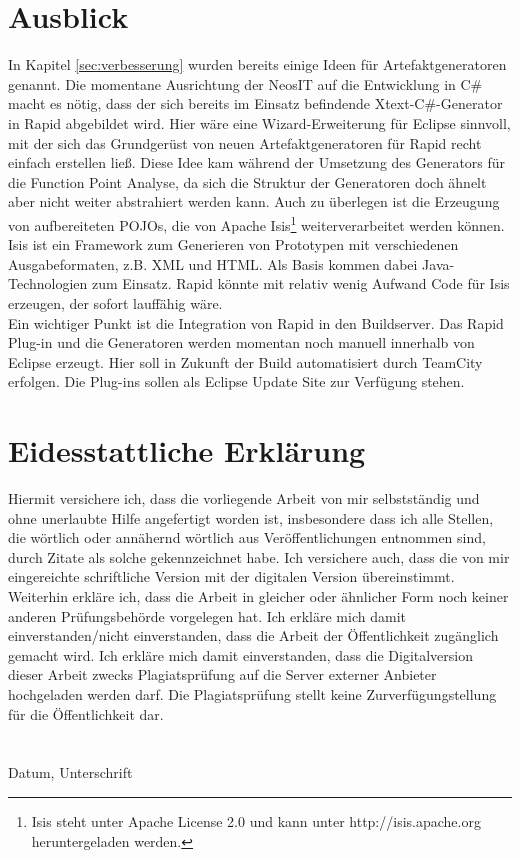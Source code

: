 \documentclass[a4paper,12pt]{scrreprt}
\begin{document}
\chapter{Ausblick}
In Kapitel \ref{sec:verbesserung} wurden bereits einige Ideen für Artefaktgeneratoren genannt. Die momentane Ausrichtung der NeosIT auf die Entwicklung in C\# macht es nötig, dass der sich bereits im Einsatz befindende Xtext-C\#-Generator in Rapid abgebildet wird. Hier wäre eine Wizard-Erweiterung für Eclipse sinnvoll, mit der sich das Grundgerüst von neuen Artefaktgeneratoren für Rapid recht einfach erstellen ließ. Diese Idee kam während der Umsetzung des Generators für die Function Point Analyse, da sich die Struktur der Generatoren doch ähnelt aber nicht weiter abstrahiert werden kann.
Auch zu überlegen ist die Erzeugung von aufbereiteten POJOs, die von Apache Isis\footnote{Isis steht unter Apache License 2.0 und kann unter http://isis.apache.org heruntergeladen werden.} weiterverarbeitet werden können. Isis ist ein Framework zum Generieren von Prototypen mit verschiedenen Ausgabeformaten, z.B. XML und HTML. Als Basis kommen dabei Java-Technologien zum Einsatz. Rapid könnte mit relativ wenig Aufwand Code für Isis erzeugen, der sofort lauffähig wäre.
\\
Ein wichtiger Punkt ist die Integration von Rapid in den Buildserver. Das Rapid Plug-in und die Generatoren werden momentan noch manuell innerhalb von Eclipse erzeugt. Hier soll in Zukunft der Build automatisiert durch TeamCity erfolgen. Die Plug-ins sollen als Eclipse Update Site zur Verfügung stehen.

\appendix

\leerSeiteAnhang

\chapter*{Eidesstattliche Erklärung}
Hiermit versichere ich, dass die vorliegende Arbeit von mir selbstständig und ohne unerlaubte Hilfe 
angefertigt worden ist, insbesondere dass ich alle Stellen, die wörtlich oder annähernd wörtlich aus 
Veröffentlichungen entnommen sind, durch Zitate als solche gekennzeichnet habe. Ich versichere 
auch, dass die von mir eingereichte schriftliche Version mit der digitalen Version übereinstimmt. 
Weiterhin erkläre ich, dass die Arbeit in gleicher oder ähnlicher Form noch keiner anderen 
Prüfungsbehörde vorgelegen hat. Ich erkläre mich damit einverstanden/nicht einverstanden, dass die 
Arbeit der Öffentlichkeit zugänglich gemacht wird. Ich erkläre mich damit einverstanden, dass die 
Digitalversion dieser Arbeit zwecks Plagiatsprüfung auf die Server externer Anbieter hochgeladen 
werden darf. Die Plagiatsprüfung stellt keine Zurverfügungstellung für die Öffentlichkeit dar.
\\
\\
\\
Datum, Unterschrift
	
\end{document}
